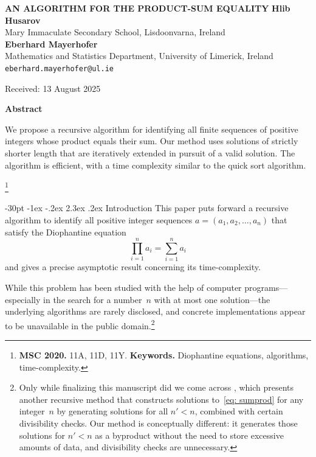 \documentclass[10pt]{article}
\makeatletter
\renewcommand\section{\@startsection {section}{1}{\z@}
  {-30pt \@plus -1ex \@minus -.2ex}
  {2.3ex \@plus .2ex}
  {\normalfont\normalsize\bfseries\boldmath}}
\newcommand\blfootnote[1]{%
  \begingroup
  \renewcommand\thefootnote{}\footnote{#1}%
  \addtocounter{footnote}{-1}%
  \endgroup
}
\theoremstyle{definition}
\theoremstyle{remark}
\numberwithin{equation}{section}
\makeatother
\begin{document}
\begin{center}
\uppercase{\bf \boldmath An Algorithm for the Product-Sum Equality}
\vskip 20pt
{\bf Hlib Husarov}\\
{\smallit Mary Immaculate Secondary School, Lisdoonvarna, Ireland}\\
\vskip 10pt
{\bf Eberhard Mayerhofer}\\
{\smallit Mathematics and Statistics Department, University of Limerick, Ireland}\\
{\tt eberhard.mayerhofer@ul.ie}\\
\end{center}

\vskip 20pt
\centerline{\smallit Received: 13 August 2025}%
\vskip 30pt


\centerline{\bf Abstract}
\noindent
We propose a recursive algorithm for identifying all finite sequences of positive integers whose product equals their sum. Our method uses solutions of strictly shorter length that are iteratively extended in pursuit of a valid solution. The algorithm is efficient, with a time complexity similar to the quick sort algorithm.

\pagestyle{myheadings}
\thispagestyle{empty}
\baselineskip=12.875pt
\vskip 30pt

\blfootnote{\textbf{MSC 2020.} 11A, 11D, 11Y. \textbf{Keywords.} Diophantine equations, algorithms, time-complexity.}


\section{Introduction}\label{sec: intro}
This paper puts forward a recursive algorithm to identify all positive integer sequences $a=(a_1,a_2,\dots,a_n)$ that satisfy the Diophantine equation
\begin{equation}\label{eq: sumprod}
\prod_{i=1}^n a_i = \sum_{i=1}^n a_i
\end{equation}
and gives a precise asymptotic result concerning its time-complexity.


While this problem has been studied with the help of computer programs---especially in the search for a number~$n$ with at most one solution---the underlying algorithms are rarely disclosed, and concrete implementations appear to be unavailable in the public domain.\footnote{Only while finalizing this manuscript did we come across \cite{nyblom2013}, which presents another recursive method that constructs solutions to~\eqref{eq: sumprod} for any integer~$n$ by generating solutions for all $n' < n$, combined with certain divisibility checks. Our method is conceptually different: it generates those solutions for $n'<n$ as a byproduct without the need to store excessive amounts of data, and divisibility checks are unnecessary.}
\end{document}
